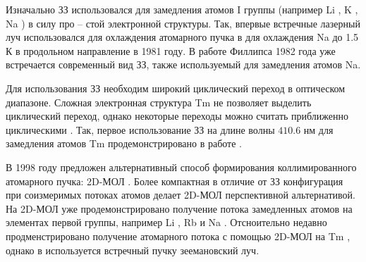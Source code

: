


% 

Изначально ЗЗ использовался для замедления атомов I группы (например 
Li \cite{stack_ultra-cold_2010}, 
K \cite{Lee2007}, %
Na \cite{zhao2014optimizing}) в силу про -- стой электронной структуры. Так, впервые встречные лазерный луч использовался для охлаждения атомарного пучка в \cite{__1981} для охлаждения Na до 1.5\,К в продольном направление в 1981 году. В работе Филлипса \cite{PhysRevLett.48.596} 1982 года уже встречается современный вид ЗЗ, также используемый для замедления атомов Na. 

Для использования ЗЗ необходим широкий циклический переход в оптическом диапазоне. Сложная электронная структура Tm не позволяет выделить циклический переход, однако некоторые переходы можно считать приближенно циклическими \cite{Kolachevsky2007}. Так, первое использование ЗЗ на длине волны $410.6$ нм для замедления атомов Tm продемонстрировано в работе \cite{Chebakov_2009}. 


В 1998 году предложен альтернативный способ формирования коллимированного атомарного пучка: 2D-МОЛ \cite{PhysRevA.58.3891}. Более компактная в отличие от ЗЗ конфигурация при соизмеримых потоках атомов делает 2D-МОЛ перспективной альтернативой. На 2D-МОЛ уже продемонстрировано получение потока замедленных атомов на элементах первой группы, например Li \cite{tiecke_high-flux_2009}, Rb \cite{ravenhall_high-flux_2021} и Na \cite{Lamporesi_2013}. Отсноительно недавно продменстрировано получение атомарного потока с помощью 2D-МОЛ на Tm \cite{golovizin_compact_2021}, однако в \cite{golovizin_compact_2021} используется встречный пучку зеемановский луч. 



